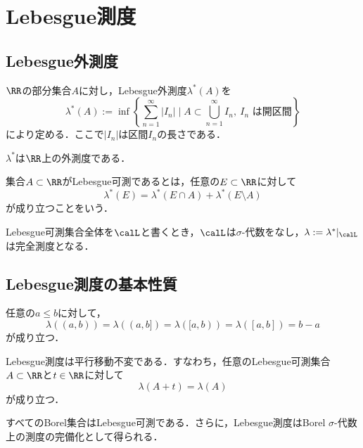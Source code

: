 \section{Lebesgue測度}

\subsection{Lebesgue外測度}

\begin{definition}
    $\RR$の部分集合$A$に対し，Lebesgue外測度$\lambda^*(A)$を
    \[
    \lambda^*(A)
    := \inf \left\{ \sum_{n=1}^{\infty} |I_n| \mid A \subset \bigcup_{n=1}^{\infty} I_n,\ I_n \text{ は開区間} \right\}
    \]
    により定める．ここで$|I_n|$は区間$I_n$の長さである．
\end{definition}

\begin{theorem}
    $\lambda^*$は$\RR$上の外測度である．
\end{theorem}

\begin{definition}
    集合$A \subset \RR$がLebesgue可測であるとは，任意の$E \subset \RR$に対して
    \[
    \lambda^*(E) = \lambda^*(E \cap A) + \lambda^*(E \setminus A)
    \]
    が成り立つことをいう．
\end{definition}

\begin{theorem}
    Lebesgue可測集合全体を$\calL$と書くとき，$\calL$は$\sigma$-代数をなし，$\lambda := \lambda^*|_{\calL}$は完全測度となる．
\end{theorem}

\subsection{Lebesgue測度の基本性質}

\begin{theorem}
    任意の$a \le b$に対して，
    \[
    \lambda((a,b)) = \lambda((a,b]) = \lambda([a,b)) = \lambda([a,b]) = b-a
    \]
    が成り立つ．
\end{theorem}

\begin{theorem}
    Lebesgue測度は平行移動不変である．すなわち，任意のLebesgue可測集合$A \subset \RR$と$t \in \RR$に対して
    \[
    \lambda(A+t) = \lambda(A)
    \]
    が成り立つ．
\end{theorem}

\begin{theorem}
    すべてのBorel集合はLebesgue可測である．さらに，Lebesgue測度はBorel $\sigma$-代数上の測度の完備化として得られる．
\end{theorem}

